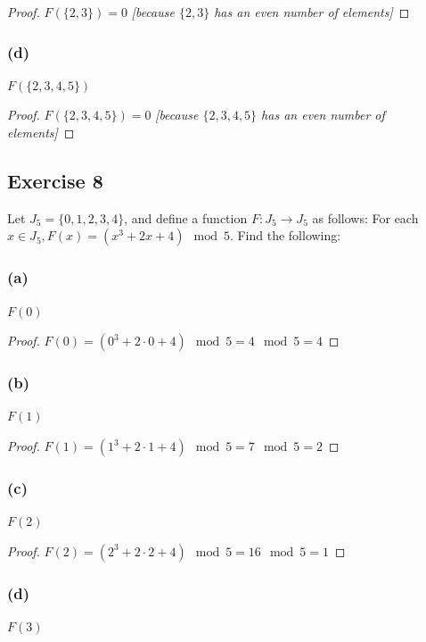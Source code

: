 \documentclass[14pt]{extarticle}
\begin{document}
\begin{proof}
\(F(\{2, 3\}) = 0\) {\it [because \(\{2, 3\}\) has an even number of elements]}
\end{proof}

\subsubsection{(d)}
\(F(\{2, 3, 4, 5\})\)

\begin{proof}
\(F(\{2, 3, 4, 5\}) = 0\) {\it [because \(\{2, 3, 4, 5\}\) has an even number of elements]}
\end{proof}

\subsection{Exercise 8}
Let \(J_5 = \{0, 1, 2, 3, 4\}\), and define a function \(F: J_5 \to J_5\) as follows: For each \(x \in J_5, F(x) = (x^3 
+ 2x + 4) \mod 5\). Find the following:

\subsubsection{(a)}
$F(0)$

\begin{proof}
\(F(0) = (0^3 + 2 \cdot 0 + 4) \mod 5 = 4 \mod 5 = 4\)

\end{proof}

\subsubsection{(b)}
$F(1)$

\begin{proof}
\(F(1) = (1^3 + 2 \cdot 1 + 4) \mod 5 = 7 \mod 5 = 2\)
\end{proof}

\subsubsection{(c)}
$F(2)$

\begin{proof}
\(F(2) = (2^3 + 2 \cdot 2 + 4) \mod 5 = 16 \mod 5 = 1\)
\end{proof}

\subsubsection{(d)}
$F(3)$
\end{document}

